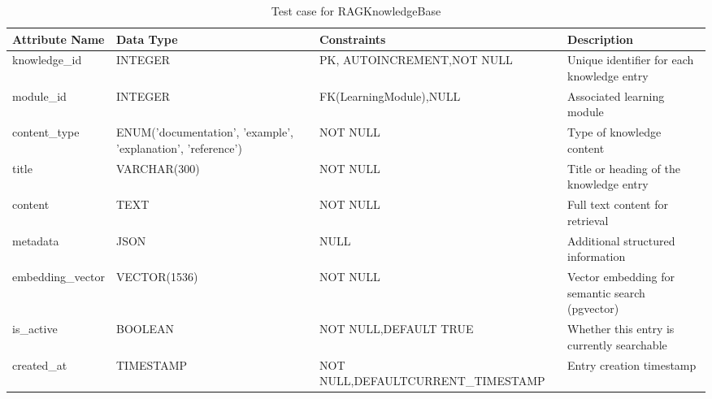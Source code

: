 \documentclass{FastFyp}
\begin{document}
\begin{samepage}


\begin{table}[H]
\footnotesize
\centering
\caption{Test case for RAGKnowledgeBase}
\begin{tabular}{|p{3cm}|p{2.3cm}|p{3.8cm}|p{4.4cm}|}
\hline
Attribute Name & Data Type & Constraints & Description \\ \hline
knowledge\_id & INTEGER & PK, AUTO\newline INCREMENT,\newline NOT NULL & Unique identifier for each knowledge entry \\ \hline
module\_id & INTEGER & FK(LearningModule),\newline NULL & Associated learning module \\ \hline
content\_type & ENUM('documentation', 'example', 'explanation', 'reference') & NOT NULL & Type of knowledge content \\ \hline
title & VARCHAR(300) & NOT NULL & Title or heading of the knowledge entry \\ \hline
content & TEXT & NOT NULL & Full text content for retrieval \\ \hline
metadata & JSON & NULL & Additional structured information \\ \hline
embedding\_vector & VECTOR(1536) & NOT NULL & Vector embedding for semantic search (pgvector) \\ \hline
is\_active & BOOLEAN & NOT NULL,\newline DEFAULT TRUE & Whether this entry is currently searchable \\ \hline
created\_at & TIMESTAMP & NOT NULL,\newline DEFAULT\newline CURRENT\_TIMESTAMP & Entry creation timestamp \\ \hline
\end{tabular}
\end{table}
\end{samepage}
\end{document}
